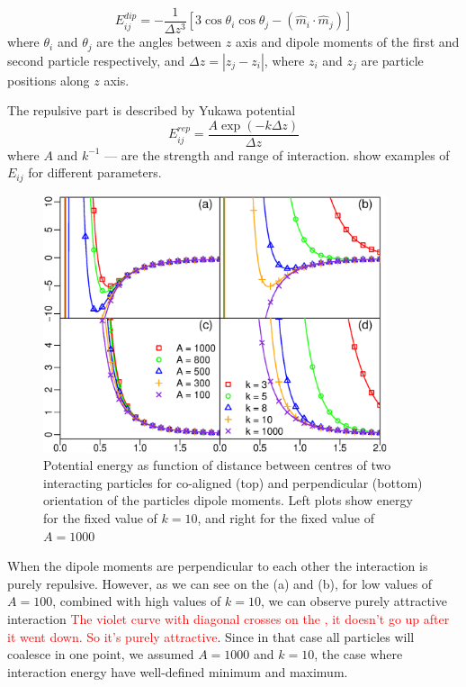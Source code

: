 \begin{equation}
\label{eq:dipole_dipole_1D}
E_{ij}^{dip} = - \frac{1}{\Delta z^3} [3 \cos \theta_i \cos \theta_j - (\hat{m}_i \cdot \hat{m}_j)]
\end{equation}
where $\theta_i$ and $\theta_j$ are the angles between $z$ axis and dipole moments of the first and second particle respectively, and $\Delta z = |z_j - z_i|$, where $z_i$ and $z_j$ are particle positions along $z$ axis.

The repulsive part is described by Yukawa potential
\begin{equation}
\label{eq:yukawa_interaction}
E_{ij}^{rep} = \frac{A \exp(-k \Delta z)}{\Delta z}
\end{equation}
where $A$ and $k^{-1}$ --- are the strength and range of interaction.  show examples of $E_{ij}$ for different parameters.

\begin{figure}[p]
\centering
	\includegraphics[width=0.9\textwidth]{Images/particle_interaction_potential}
\captionsetup{justification=centering, width=0.9\textwidth}
\caption{Potential energy as function of distance between centres of two interacting particles for co-aligned (top) and perpendicular (bottom) orientation of the particles dipole moments. Left plots show energy for the fixed value of $k = 10$, and right for the fixed value of $A = 1000$}
\label{fig:interaction_energy}
\end{figure}

When the dipole moments are perpendicular to each other the interaction is purely repulsive. However, as we can see on the (a) and (b), for low values of $A = 100$, combined with high values of $k = 10$, we can observe purely attractive interaction \textcolor{red}{The violet curve with diagonal crosses on the , it doesn't go up after it went down. So it's purely attractive}. Since in that case all particles will coalesce in one point, we assumed $A = 1000$ and $k = 10$, the case where interaction energy have well-defined minimum and maximum.
